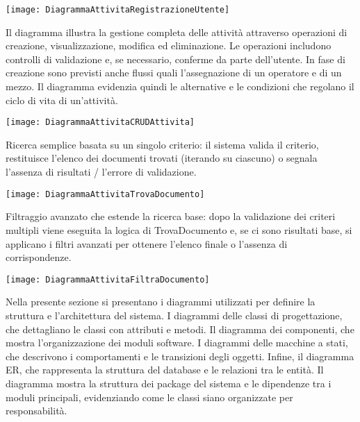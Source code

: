 \documentclass[a4paper]{report}
\begin{document}
\begin{figure*}[!ht]
    \centering
    \texttt{[image: DiagrammaAttivitaRegistrazioneUtente]}
\end{figure*}

\clearpage
{}
Il diagramma illustra la gestione completa delle attività attraverso operazioni di creazione, visualizzazione, modifica ed eliminazione. Le operazioni includono controlli di validazione e, se necessario, conferme da parte dell’utente. In fase di creazione sono previsti anche flussi quali l’assegnazione di un operatore e di un mezzo. Il diagramma evidenzia quindi le alternative e le condizioni che regolano il ciclo di vita di un’attività.

\begin{figure*}[!ht]
    \centering
    \texttt{[image: DiagrammaAttivitaCRUDAttivita]}
\end{figure*}

\clearpage
{}
Ricerca semplice basata su un singolo criterio: il sistema valida il criterio, restituisce l’elenco dei documenti trovati (iterando su ciascuno) o segnala l’assenza di risultati / l’errore di validazione.

\begin{figure*}[!ht]
    \centering
    \texttt{[image: DiagrammaAttivitaTrovaDocumento]}
\end{figure*}

\clearpage
{}
Filtraggio avanzato che estende la ricerca base: dopo la validazione dei criteri multipli viene eseguita la logica di TrovaDocumento e, se ci sono risultati base, si applicano i filtri avanzati per ottenere l’elenco finale o l’assenza di corrispondenze.

\begin{figure*}[!ht]
    \centering
    \texttt{[image: DiagrammaAttivitaFiltraDocumento]}
\end{figure*}

Nella presente sezione si presentano i diagrammi utilizzati per definire la struttura e l’architettura del sistema. I diagrammi delle classi di progettazione, che dettagliano le classi con attributi e metodi. Il diagramma dei componenti, che mostra l’organizzazione dei moduli software. I diagrammi delle macchine a stati, che descrivono i comportamenti e le transizioni degli oggetti. Infine, il diagramma ER, che rappresenta la struttura del database e le relazioni tra le entità.
Il diagramma mostra la struttura dei package del sistema e le dipendenze tra i moduli principali, evidenziando come le classi siano organizzate per responsabilità.
\end{document}
